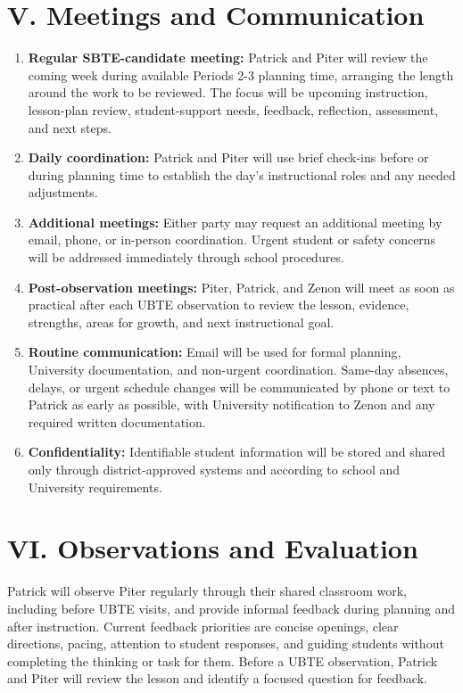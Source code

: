 \documentclass[10pt]{article}
\begin{document}
\section*{V. Meetings and Communication}

\begin{enumerate}
  \item \textbf{Regular SBTE-candidate meeting:} Patrick and Piter will review the coming week during available Periods 2-3 planning time, arranging the length around the work to be reviewed. The focus will be upcoming instruction, lesson-plan review, student-support needs, feedback, reflection, assessment, and next steps.
  \item \textbf{Daily coordination:} Patrick and Piter will use brief check-ins before or during planning time to establish the day's instructional roles and any needed adjustments.
  \item \textbf{Additional meetings:} Either party may request an additional meeting by email, phone, or in-person coordination. Urgent student or safety concerns will be addressed immediately through school procedures.
  \item \textbf{Post-observation meetings:} Piter, Patrick, and Zenon will meet as soon as practical after each UBTE observation to review the lesson, evidence, strengths, areas for growth, and next instructional goal.
  \item \textbf{Routine communication:} Email will be used for formal planning, University documentation, and non-urgent coordination. Same-day absences, delays, or urgent schedule changes will be communicated by phone or text to Patrick as early as possible, with University notification to Zenon and any required written documentation.
  \item \textbf{Confidentiality:} Identifiable student information will be stored and shared only through district-approved systems and according to school and University requirements.
\end{enumerate}

\section*{VI. Observations and Evaluation}

Patrick will observe Piter regularly through their shared classroom work, including before UBTE visits, and provide informal feedback during planning and after instruction. Current feedback priorities are concise openings, clear directions, pacing, attention to student responses, and guiding students without completing the thinking or task for them. Before a UBTE observation, Patrick and Piter will review the lesson and identify a focused question for feedback.
\end{document}
